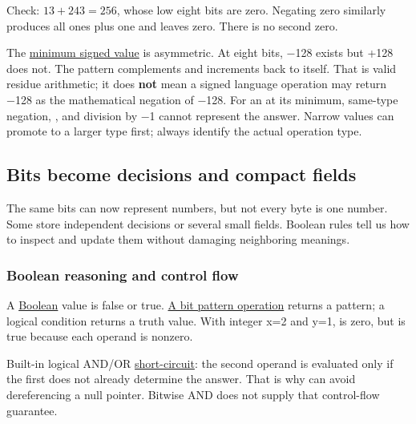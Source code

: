 Check: \(13+243=256\), whose low eight bits are zero. Negating zero similarly produces all ones plus one and leaves zero. There is no second zero.

The \hyperref[appendix-05f39b10364d]{minimum signed value} is asymmetric. At eight bits, −128 exists but +128 does not. The pattern  complements and increments back to itself. That is valid residue arithmetic; it does \textbf{not} mean a signed language operation may return −128 as the mathematical negation of −128. For an  at its minimum, same-type negation, , and division by −1 cannot represent the answer. Narrow values can promote to a larger type first; always identify the actual operation type.

\subsection{Bits become decisions and compact fields}\label{01-foundations-i-ch001-bits-become-decisions-and-compact-fields}

\hypertarget{01-foundations-i-ch001-bits-become-decisions-and-compact-fields}{}

The same bits can now represent numbers, but not every byte is one number. Some store independent decisions or several small fields. Boolean rules tell us how to inspect and update them without damaging neighboring meanings.

\subsubsection{Boolean reasoning and control flow}\label{01-foundations-i-ch001-boolean-reasoning-and-control-flow}

\hypertarget{01-foundations-i-ch001-boolean-reasoning-and-control-flow}{}

A \hyperref[appendix-24475e1596a8]{Boolean} value is false or true. \hyperref[appendix-fe6b457d68d8]{A bit pattern operation} returns a pattern; a logical condition returns a truth value. With integer x=2 and y=1,  is zero, but  is true because each operand is nonzero.

Built-in logical AND/OR \hyperref[appendix-2e245a6fa8d3]{short-circuit}: the second operand is evaluated only if the first does not already determine the answer. That is why  can avoid dereferencing a null pointer. Bitwise AND does not supply that control-flow guarantee.

